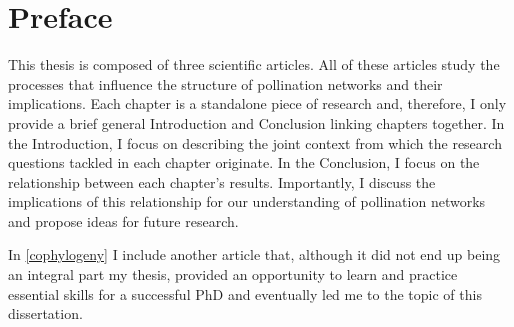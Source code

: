 
{}
\chapter*{Preface}

\manualmark
{}

\noindent This thesis is composed of three scientific articles.
All of these articles study the processes that influence the structure of pollination networks and their implications.
Each chapter is a standalone piece of research and, therefore, I only provide a brief general Introduction and Conclusion linking chapters together.
In the Introduction, I focus on describing the joint context from which the research questions tackled in each chapter originate.
In the Conclusion, I focus on the relationship between each chapter's results.
Importantly, I discuss the implications of this relationship for our understanding of pollination networks and propose ideas for future research.

In \autoref{cophylogeny} I include another article that, although it did not end up being an integral part my thesis, provided an opportunity to learn and practice essential skills for a successful PhD and eventually led me to the topic of this dissertation.

\vfill
